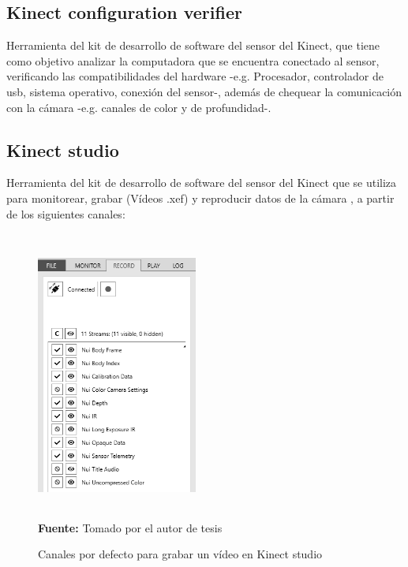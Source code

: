 \subsection{Kinect configuration verifier} \label{ins:KinectCheckt}
Herramienta del kit de desarrollo de software del sensor del Kinect, que tiene como objetivo  analizar la computadora que se encuentra conectado al sensor, verificando las compatibilidades del hardware -e.g. Procesador, controlador de usb, sistema operativo, conexi\'on del sensor-, adem\'as de chequear la comunicaci\'on con la c\'amara -e.g. canales de color y de profundidad-.
\subsection{Kinect studio} \label{ins:KinectStudio}
Herramienta del kit de desarrollo de software del sensor del Kinect que se utiliza para monitorear, grabar (V\'ideos .xef) y reproducir datos de la c\'amara \cite{KinectStudio2019}, a partir de los siguientes canales:
\begin{figure}[H]
	\caption{Canales por defecto para grabar un v\'ideo en Kinect studio }
	\label{fig:streamDefault}
	\centering
	\includegraphics[width=200px,height=360px]{graphics/streamsRecord.PNG} \\
	\textbf{Fuente:} Tomado por el autor de tesis
\end{figure} 

